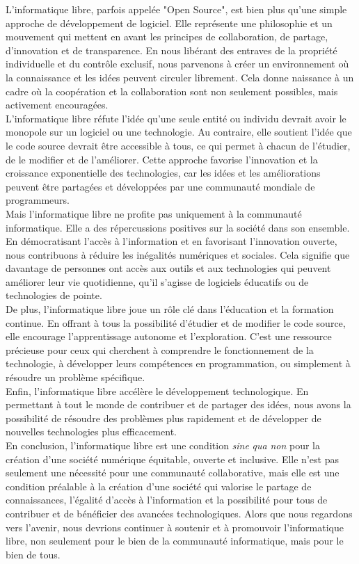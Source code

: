 L'informatique libre, parfois appelée "Open Source", est bien plus qu'une simple approche de développement de logiciel. Elle représente une philosophie et un mouvement qui mettent en avant les principes de collaboration, de partage, d'innovation et de transparence. En nous libérant des entraves de la propriété individuelle et du contrôle exclusif, nous parvenons à créer un environnement où la connaissance et les idées peuvent circuler librement. Cela donne naissance à un cadre où la coopération et la collaboration sont non seulement possibles, mais activement encouragées.\\

L'informatique libre réfute l'idée qu'une seule entité ou individu devrait avoir le monopole sur un logiciel ou une technologie. Au contraire, elle soutient l'idée que le code source devrait être accessible à tous, ce qui permet à chacun de l'étudier, de le modifier et de l'améliorer. Cette approche favorise l'innovation et la croissance exponentielle des technologies, car les idées et les améliorations peuvent être partagées et développées par une communauté mondiale de programmeurs.\\

Mais l'informatique libre ne profite pas uniquement à la communauté informatique. Elle a des répercussions positives sur la société dans son ensemble. En démocratisant l'accès à l'information et en favorisant l'innovation ouverte, nous contribuons à réduire les inégalités numériques et sociales. Cela signifie que davantage de personnes ont accès aux outils et aux technologies qui peuvent améliorer leur vie quotidienne, qu'il s'agisse de logiciels éducatifs ou de technologies de pointe. \\

De plus, l'informatique libre joue un rôle clé dans l'éducation et la formation continue. En offrant à tous la possibilité d'étudier et de modifier le code source, elle encourage l'apprentissage autonome et l'exploration. C'est une ressource précieuse pour ceux qui cherchent à comprendre le fonctionnement de la technologie, à développer leurs compétences en programmation, ou simplement à résoudre un problème spécifique.\\

Enfin, l'informatique libre accélère le développement technologique. En permettant à tout le monde de contribuer et de partager des idées, nous avons la possibilité de résoudre des problèmes plus rapidement et de développer de nouvelles technologies plus efficacement. \\

En conclusion, l'informatique libre est une condition \textit{sine} \textit{qua} \textit{non} pour la création d'une société numérique équitable, ouverte et inclusive. Elle n'est pas seulement une nécessité pour une communauté collaborative, mais elle est une condition préalable à la création d'une société qui valorise le partage de connaissances, l'égalité d'accès à l'information et la possibilité pour tous de contribuer et de bénéficier des avancées technologiques. Alors que nous regardons vers l'avenir, nous devrions continuer à soutenir et à promouvoir l'informatique libre, non seulement pour le bien de la communauté informatique, mais pour le bien de tous.
